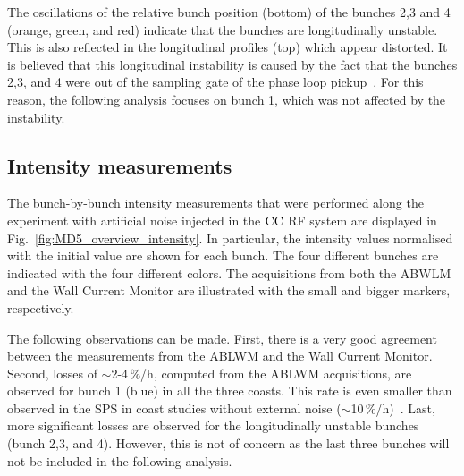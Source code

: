 
The oscillations of the relative bunch position (bottom) of the bunches 2,3 and 4 (orange, green, and red) indicate that the bunches are longitudinally unstable. This is also reflected in the longitudinal profiles (top) which appear distorted. It is believed that this longitudinal instability is caused by the fact that the bunches 2,3, and 4 were out of the sampling gate of the phase loop pickup~\cite{Argyropoulos_unstable_bunches_2018}. For this reason, the following analysis focuses on bunch 1, which was not affected by the instability. 


\subsection{Intensity measurements}\label{subsec:intensity_2018_meas}
The bunch-by-bunch intensity measurements that were performed along the experiment with artificial noise injected in the ${\mathrm{CC}}$ RF system are displayed in Fig.~\ref{fig:MD5_overview_intensity}. In particular, the intensity values normalised with the initial value are shown for each bunch. The four different bunches are indicated with the four different colors. The acquisitions from both the ABWLM and the Wall Current Monitor are illustrated with the small and bigger markers, respectively.

The following observations can be made. First, there is a very good agreement between the measurements from the ABLWM and the Wall Current Monitor. Second, losses of $\sim$2-4\,$\%$/h, computed from the ABLWM acquisitions, are observed for bunch 1 (blue) in all the three coasts. This rate is even smaller than observed in the SPS in coast studies without external noise ($\sim$10\,$\%$/h)~\cite{Alekou_CC_coast_prep_2016}. Last, more significant losses are observed for the longitudinally unstable bunches (bunch 2,3, and 4). However, this is not of concern as the last three bunches will not be included in the following analysis.

